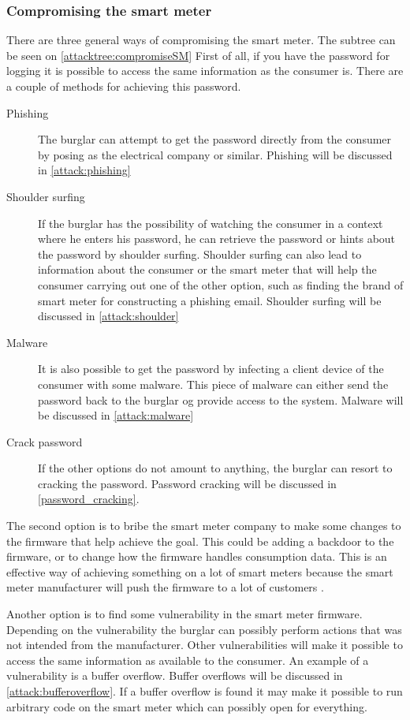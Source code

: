 \subsubsection{Compromising the smart meter}\label{compromise:SM}
There are three general ways of compromising the smart meter.
The subtree can be seen on \cref{attacktree:compromiseSM}
First of all, if you have the password for logging it is possible to access the same information as the consumer is.
There are a couple of methods for achieving this password. 
\begin{description}
	\item[Phishing] The burglar can attempt to get the password directly from the consumer by posing as the electrical company or similar. Phishing will be discussed in \cref{attack:phishing}
	\item [Shoulder surfing] If the burglar has the possibility of watching the consumer in a context where he enters his password, he can retrieve the password or hints about the password by shoulder surfing. 
	Shoulder surfing can also lead to information about the consumer or the smart meter that will help the consumer carrying out one of the other option, such as finding the brand of smart meter for constructing a phishing email.
	Shoulder surfing will be discussed in \cref{attack:shoulder}
	\item [Malware] It is also possible to get the password by infecting a client device of the consumer with some malware. This piece of malware can either send the password back to the burglar og provide access to the system. Malware will be discussed in \cref{attack:malware}
	\item [Crack password] If the other options do not amount to anything, the burglar can resort to cracking the password.
	Password cracking will be discussed in \cref{password_cracking}.
\end{description}

The second option is to bribe the smart meter company to make some changes to the firmware that help achieve the goal.
This could be adding a backdoor to the firmware, or to change how the firmware handles consumption data.
This is an effective way of achieving something on a lot of smart meters because the smart meter manufacturer will push the firmware to a lot of customers .

Another option is to find some vulnerability in the smart meter firmware.
Depending on the vulnerability the burglar can possibly perform actions that was not intended from the manufacturer.
Other vulnerabilities will make it possible to access the same information as available to the consumer.
An example of a vulnerability is a buffer overflow.
Buffer overflows will be discussed in \cref{attack:bufferoverflow}.
If a buffer overflow is found it may make it possible to run arbitrary code on the smart meter which can possibly open for everything.

